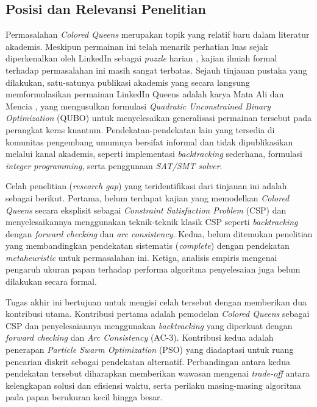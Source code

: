 \subsection{Posisi dan Relevansi Penelitian}
\label{subsec:colored-queens-relevansi}
Permasalahan \textit{Colored Queens} merupakan topik yang relatif baru dalam literatur akademis. Meskipun permainan ini telah menarik perhatian luas sejak diperkenalkan oleh LinkedIn sebagai \textit{puzzle} harian \cite{linkedin2024queens}, kajian ilmiah formal terhadap permasalahan ini masih sangat terbatas. Sejauh tinjauan pustaka yang dilakukan, satu-satunya publikasi akademis yang secara langsung memformulasikan permainan LinkedIn Queens adalah karya Mata Ali dan Mencia \cite{ali2026quboformulationgeneralizedlinkedin}, yang mengusulkan formulasi \textit{Quadratic Unconstrained Binary Optimization} (QUBO) untuk menyelesaikan generalisasi permainan tersebut pada perangkat keras kuantum. Pendekatan-pendekatan lain yang tersedia di komunitas pengembang umumnya bersifat informal dan tidak dipublikasikan melalui kanal akademis, seperti implementasi \textit{backtracking} sederhana, formulasi \textit{integer programming}, serta penggunaan \textit{SAT/SMT solver}.

Celah penelitian (\textit{research gap}) yang teridentifikasi dari tinjauan ini adalah sebagai berikut. Pertama, belum terdapat kajian yang memodelkan \textit{Colored Queens} secara eksplisit sebagai \textit{Constraint Satisfaction Problem} (CSP) dan menyelesaikannya menggunakan teknik-teknik klasik CSP seperti \textit{backtracking} dengan \textit{forward checking} dan \textit{arc consistency}. Kedua, belum ditemukan penelitian yang membandingkan pendekatan sistematis (\textit{complete}) dengan pendekatan \textit{metaheuristic} untuk permasalahan ini. Ketiga, analisis empiris mengenai pengaruh ukuran papan terhadap performa algoritma penyelesaian juga belum dilakukan secara formal.

Tugas akhir ini bertujuan untuk mengisi celah tersebut dengan memberikan dua kontribusi utama. Kontribusi pertama adalah pemodelan \textit{Colored Queens} sebagai CSP dan penyelesaiannya menggunakan \textit{backtracking} yang diperkuat dengan \textit{forward checking} dan \textit{Arc Consistency} (AC-3). Kontribusi kedua adalah penerapan \textit{Particle Swarm Optimization} (PSO) yang diadaptasi untuk ruang pencarian diskrit sebagai pendekatan alternatif. Perbandingan antara kedua pendekatan tersebut diharapkan memberikan wawasan mengenai \textit{trade-off} antara kelengkapan solusi dan efisiensi waktu, serta perilaku masing-masing algoritma pada papan berukuran kecil hingga besar.


